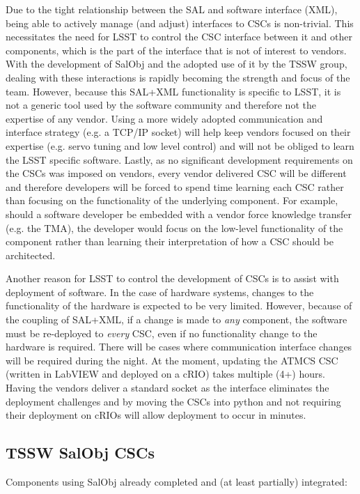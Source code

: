 \documentclass[TS,authoryear,toc]{lsstdoc}
\begin{document}
Due to the tight relationship between the SAL and software interface (XML), being able to actively manage (and adjust) interfaces to CSCs is non-trivial. This necessitates the need for LSST to control the CSC interface between it and other components, which is the part of the interface that is not of interest to vendors. With the development of SalObj and the adopted use of it by the TSSW group, dealing with these interactions is rapidly becoming the strength and focus of the team. However, because this SAL+XML functionality is specific to LSST, it is not a generic tool used by the software community and therefore not the expertise of any vendor. Using a more widely adopted communication and interface strategy (e.g. a TCP/IP socket) will help keep vendors focused on their expertise (e.g. servo tuning and low level control) and will not be obliged to learn the LSST specific software. Lastly, as no significant development requirements on the CSCs was imposed on vendors, every vendor delivered CSC will be different and therefore developers will be forced to spend time learning each CSC rather than focusing on the functionality of the underlying component. For example, should a software developer be embedded with a vendor force knowledge transfer (e.g. the TMA), the developer would focus on the low-level functionality of the component rather than learning their interpretation of how a CSC should be architected.

Another reason for LSST to control the development of CSCs is to assist with deployment of software. In the case of hardware systems, changes to the functionality of the hardware is expected to be very limited. However, because of the coupling of SAL+XML, if a change is made to \emph{any} component, the software must be re-deployed to \emph{every} CSC, even if no functionality change to the hardware is required. There will be cases where communication interface changes will be required during the night. At the moment, updating the ATMCS CSC (written in LabVIEW and deployed on a cRIO) takes multiple (4+) hours. Having the vendors deliver a standard socket as the interface eliminates the deployment challenges and by moving the CSCs into python and not requiring their deployment on cRIOs will allow deployment to occur in minutes.

\subsection{TSSW SalObj CSCs}
Components using SalObj already completed and (at least partially) integrated:
\end{document}
